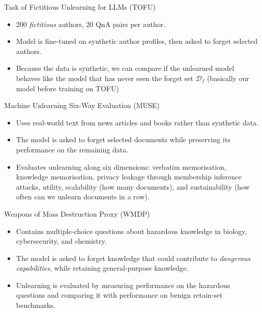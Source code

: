 \documentclass[12pt,aspectratio=169,handout]{beamer}
\begin{document}
\begin{frame}{Task of Fictitious Unlearning for LLMs (TOFU)}
\begin{itemize}
    \item 200 \emph{fictitious} authors, 20 QnA pairs per author.
    \item Model is fine-tuned on synthetic author profiles, then asked to forget selected authors.
    \item Because the data is synthetic, we can compare if the unlearned model behaves like the model that has never seen the forget set $\mathcal{D}_f$ (basically our model before training on TOFU)
\end{itemize}

\end{frame}

\begin{frame}{Machine Unlearning Six-Way Evaluation (MUSE)} 
\begin{itemize} 
\item Uses real-world text from news articles and books rather than synthetic data. 
\item The model is asked to forget selected documents while preserving its performance on the remaining data. 
\item Evaluates unlearning along six dimensions: verbatim memorisation, knowledge memorisation, privacy leakage through membership inference attacks, utility, scalability (how many documents), and sustainability (how often can we unlearn documents in a row). 
\end{itemize} 
\end{frame}

\begin{frame}{Weapons of Mass Destruction Proxy (WMDP)} 
\begin{itemize} 
\item Contains multiple-choice questions about hazardous knowledge in biology, cybersecurity, and chemistry. 
\item The model is asked to forget knowledge that could contribute to \emph{dangerous capabilities}, while retaining general-purpose knowledge. 
\item Unlearning is evaluated by measuring performance on the hazardous questions and comparing it with performance on benign retain-set benchmarks. 
\end{itemize}
\end{frame}
\end{document}
